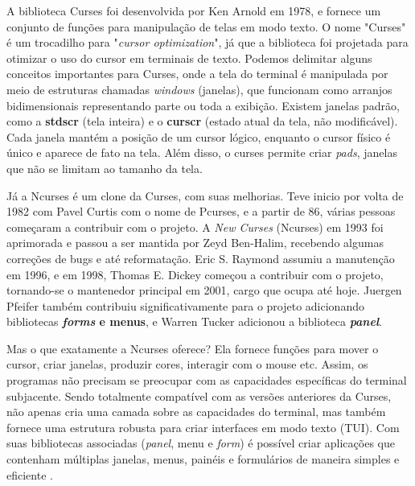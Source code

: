 A biblioteca Curses foi desenvolvida por Ken Arnold em 1978, e fornece um
conjunto de funções para manipulação de telas em modo texto. O nome "Curses" é um
trocadilho para "\textit{cursor optimization}", já que a biblioteca foi projetada
para otimizar o uso do cursor em terminais de texto. Podemos delimitar alguns
conceitos importantes para Curses, onde a tela do terminal é manipulada por meio
de estruturas chamadas \textit{windows} (janelas), que funcionam como arranjos bidimensionais
representando parte ou toda a exibição. Existem janelas padrão, como a \textbf{stdscr}
(tela inteira) e o \textbf{curscr} (estado atual da tela, não modificável). Cada
janela mantém a posição de um cursor lógico, enquanto o cursor físico é único e
aparece de fato na tela. Além disso, o curses permite criar \textit{pads},
janelas que não se limitam ao tamanho da tela. \cite{ibm_curses_aix}

Já a Ncurses é um clone da Curses, com suas melhorias. Teve inicio por volta de
1982 com Pavel Curtis com o nome de Pcurses, e a partir de 86, várias pessoas
começaram a contribuir com o projeto. A \textit{New Curses} (Ncurses) em 1993
foi aprimorada e passou a ser mantida por Zeyd Ben-Halim, recebendo algumas correções
de bugs e até reformatação. Eric S. Raymond assumiu a manutenção em 1996, e em
1998, Thomas E. Dickey começou a contribuir com o projeto, tornando-se o mantenedor
principal em 2001, cargo que ocupa até hoje. Juergen Pfeifer também contribuiu significativamente
para o projeto adicionando bibliotecas \textbf{\textit{forms} e menus}, e Warren
Tucker adicionou a biblioteca \textbf{\textit{panel}}. \cite{ncurses_site}

\vspace{0.4cm}

\vspace{0.4cm}

Mas o que exatamente a Ncurses oferece? Ela fornece funções para mover o cursor,
criar janelas, produzir cores, interagir com o mouse etc. Assim, os programas não
precisam se preocupar com as capacidades específicas do terminal subjacente.
Sendo totalmente compatível com as versões anteriores da Curses, não apenas cria
uma camada sobre as capacidades do terminal, mas também fornece uma estrutura
robusta para criar interfaces em modo texto (TUI). Com suas bibliotecas associadas
(\textit{panel}, menu e \textit{form}) é possível criar aplicações que contenham
múltiplas janelas, menus, painéis e formulários de maneira simples e eficiente
\cite{ncurses_howto}.

